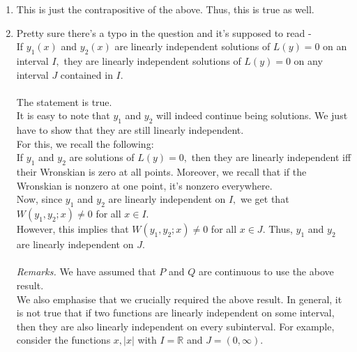 \documentclass{article}
\begin{document}
\begin{enumerate}[label = Q.\arabic*.]
\begin{enumerate}[label = (\roman*)]
\begin{proof}
			We show that this is possible only if $\alpha = \beta = 0.$ This will prove linear independence.\\
			From (\ref{eq:linJ}), we can deduce that
			\begin{equation} \label{eq:linI}
			\alpha y_1(x) + \beta y_2(x) = 0 \quad \forall x \in I.
			\end{equation}
			(Why?)\\
			However, $y_1$ and $y_2$ were assumed to be linearly independent on $I.$ Thus, from (\ref{eq:linI}), we can conclude that $\alpha = \beta = 0,$ as desired.
		\end{proof}
		\item This is just the contrapositive of the above. Thus, this is true as well.
		\item Pretty sure there's a typo in the question and it's supposed to read -\\
		If $y_1(x)$ and $y_2(x)$ are linearly independent solutions of $L(y) = 0$ on an interval $I,$ they are linearly independent solutions of $L(y) = 0$ on any interval $J$ contained in $I.$\\\\
		The statement is true.\\
		It is easy to note that $y_1$ and $y_2$ will indeed continue being solutions. We just have to show that they are still linearly independent.\\
		For this, we recall the following:\\
		If $y_1$ and $y_2$ are solutions of $L(y) = 0,$ then they are linearly independent iff their Wronskian is zero at all points. Moreover, we recall that if the Wronskian is nonzero at one point, it's nonzero everywhere.\\
		Now, since $y_1$ and $y_2$ are linearly independent on $I,$ we get that $W(y_1, y_2;x) \neq 0$ for all $x \in I.$\\
		However, this implies that $W(y_1, y_2;x) \neq 0$ for all $x \in J.$ Thus, $y_1$ and $y_2$ are linearly independent on $J.$\\\\
		\emph{Remarks.} We have assumed that $P$ and $Q$ are continuous to use the above result.\\
		We also emphasise that we crucially required the above result. In general, it is not true that if two functions are linearly independent on some interval, then they are also linearly independent on every subinterval. For example, consider the functions $x, |x|$ with $I = \mathbb{R}$ and $J = (0, \infty).$

\end{enumerate}
\end{enumerate}
\end{document}
